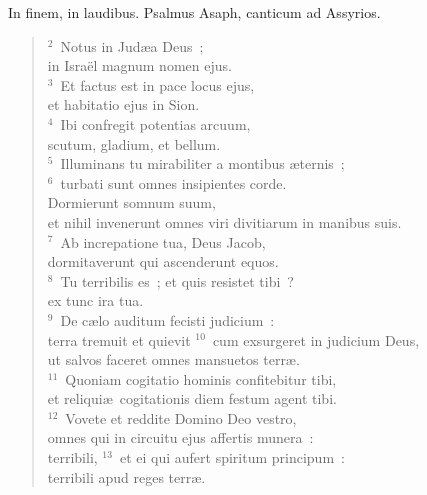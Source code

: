 \lettrine[lines=3,image=true,loversize=0.05,lraise=-0.03]{I}{}n finem, in laudibus. Psalmus Asaph, canticum ad Assyrios.
\begin{flushleft}\begin{verse}\vspace{6pt}${}^{2}$~Notus in Jud\ae a Deus~;\\ in Isra\"el magnum nomen ejus.\\
${}^{3}$~Et factus est in pace locus ejus,\\ et habitatio ejus in Sion.\\
${}^{4}$~Ibi confregit potentias arcuum,\\ scutum, gladium, et bellum.\\
${}^{5}$~Illuminans tu mirabiliter a montibus \ae ternis~;\\
${}^{6}$~turbati sunt omnes insipientes corde.\\ Dormierunt somnum suum,\\ et nihil invenerunt omnes viri divitiarum in manibus suis.\\
${}^{7}$~Ab increpatione tua, Deus Jacob,\\ dormitaverunt qui ascenderunt equos.\\
${}^{8}$~Tu terribilis es~; et quis resistet tibi~?\\ ex tunc ira tua.\\
${}^{9}$~De c\ae lo auditum fecisti judicium~:\\ terra tremuit et quievit
${}^{10}$~cum exsurgeret in judicium Deus,\\ ut salvos faceret omnes mansuetos terr\ae .\\
${}^{11}$~Quoniam cogitatio hominis confitebitur tibi,\\ et reliqui\ae\ cogitationis diem festum agent tibi.\\
${}^{12}$~Vovete et reddite Domino Deo vestro,\\ omnes qui in circuitu ejus affertis munera~:\\ terribili,
${}^{13}$~et ei qui aufert spiritum principum~:\\ terribili apud reges terr\ae .\end{verse}\end{flushleft}



